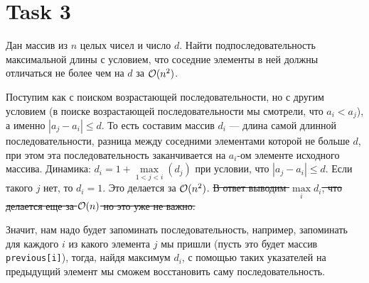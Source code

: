\section{Task 3}
\begin{task}
    Дан массив из $n$ целых чисел и число $d$. Найти подпоследовательность максимальной длины с условием, что соседние элементы в ней должны отличаться не более чем на $d$ за $\mathcal{O}(n^2)$.
\end{task}

\begin{solution}
    Поступим как с поиском возрастающей последовательности, но с другим условием (в поиске возрастающей последовательности мы смотрели, что $a_i < a_j$), а именно $\left|a_j - a_i\right| \leq d$.
    То есть составим массив $d_i$ --- длина самой длинной последовательности, разница между соседними элементами которой не больше $d$, при этом эта последовательность заканчивается на $a_i$-ом элементе исходного массива.
    Динамика: $d_i = 1 + \max\limits_{1<j<i}(d_j)$ при условии, что $\left|a_j - a_i\right| \leq d$.
    Если такого $j$ нет, то $d_i = 1$. Это делается за $\mathcal{O}(n^2)$.
    \sout{В ответ выводим $\max\limits_{i}d_i$, что делается еще за $\mathcal{O}(n)$ но это уже не важно.}
    \begin{upd}
        Значит, нам надо будет запоминать последовательность, например, запоминать для каждого $i$ из какого элемента $j$ мы пришли (пусть это будет массив \texttt{previous[i]}), тогда, найдя максимум $d_i$, с помощью таких указателей на предыдущий элемент мы сможем восстановить саму последовательность.
    \end{upd}
\end{solution}